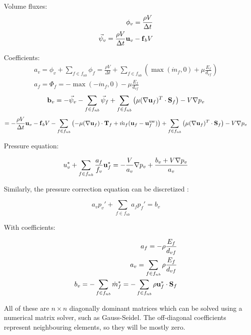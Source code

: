 \documentclass[12pt]{article}
\newcommand{\lb}{\left(}
\newcommand{\rb}{\right)}
\newcommand{\vb}[1]{\text{\textbf{#1}}}
\begin{document}
  Volume fluxes:
    \begin{align}
      \phi_v = \frac{\rho V}{\Delta t} \\
      \vec \psi_v = \frac{\rho V}{\Delta t} \vb u_v - \vb f_b V
    \end{align}

    Coefficients:
  \begin{align}
    a_v = \phi_v + \sum_{f \in f_{nb}} \phi_f = \frac{\rho V}{\Delta t} + \sum_{f \in f_{nb}} \lb \max(\dot m_f, 0) + \mu \frac{E_f}{d_{vf}} \rb \\
    a_f = \Phi_f = -\max(-\dot m_f, 0) - \mu \frac{E_f}{d_{vf}}
  \end{align}
  \begin{equation}
    \vb b_v = -\vec \psi_v - \sum_{f \in f_{nb}} \vec \psi_f + \sum_{f \in f_{nb}} \lb \mu (\nabla \vb u_f)^T \cdot \vb S_f \rb - V \nabla p_v
    \end{equation}
  $$
    = - \frac{\rho V}{\Delta t} \vb u_v - \vb f_b V - \sum_{f \in f_{nb}} \lb - \mu (\nabla \vb u_f) \cdot \vb T_f + \dot m_f (\vb u_f - \vb u_f^{\text{uw}}) \rb + \sum_{f \in f_{nb}} \lb \mu (\nabla \vb u_f)^T \cdot \vb S_f \rb - V \nabla p_v
$$

Pressure equation:

\begin{equation}
  u_v^* + \sum_{f \in f_{nb}} \frac{a_f}{f_v} \vb u_f^* = -\frac{V}{a_v} \nabla p_v + \frac{b_v + V \nabla p_v}{a_v}
  \end{equation}

  Similarly, the pressure correction equation can be discretized \cite{mou}:

  \begin{equation}
    a_v p_v' + \sum_{f \in f_{nb}} a_f p_f' = b_v
  \end{equation}

  With coefficients:

  \begin{align}
    a_f = -\rho \frac{E_f}{d_{vf}} \\
    a_v = \sum_{f \in f_{nb}} \rho \frac{E_f}{d_{vf}}\\
    b_v = - \sum_{f \in f_{nb}} \dot m_f^* = - \sum_{f \in f_{nb}} \rho \vb u_f^* \cdot \vb S_f
    \end{align}

    All of these are $n \times n$ diagonally dominant matrices which can be solved using a numerical matrix solver, such as Gauss-Seidel. The off-diagonal coefficients represent neighbouring elements, so they will be mostly zero.
\end{document}
